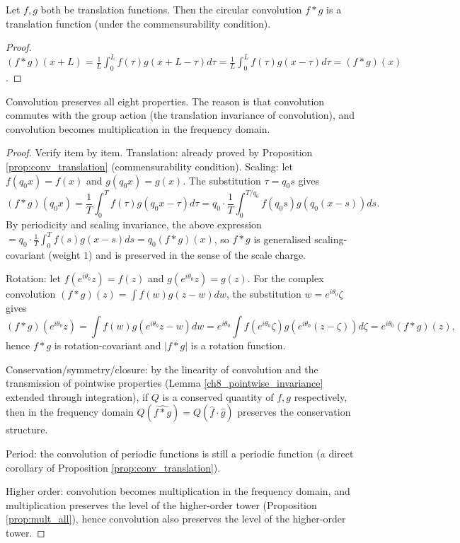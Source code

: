 \begin{proposition}\label{prop:conv_translation}
Let $f, g$ both be translation functions. Then the circular convolution $f * g$ is a translation function (under the commensurability condition).
\end{proposition}

\begin{proof}
$(f * g)(x+L) = \frac{1}{L}\int_0^L f(\tau) g(x+L-\tau) d\tau = \frac{1}{L}\int_0^L f(\tau) g(x-\tau) d\tau = (f * g)(x)$.
\end{proof}

\begin{proposition}\label{prop:conv_all}
Convolution preserves all eight properties. The reason is that convolution commutes with the group action (the translation invariance of convolution), and convolution becomes multiplication in the frequency domain.
\end{proposition}

\begin{proof}
Verify item by item. Translation: already proved by Proposition \ref{prop:conv_translation} (commensurability condition). Scaling: let $f(q_0x)=f(x)$ and $g(q_0x)=g(x)$. The substitution $\tau=q_0s$ gives
\[
(f*g)(q_0x)=\frac{1}{T}\int_0^T f(\tau)g(q_0x-\tau)d\tau
=q_0\cdot\frac{1}{T}\int_0^{T/q_0}f(q_0s)g(q_0(x-s))ds.
\]
By periodicity and scaling invariance, the above expression $=q_0\cdot\frac{1}{T}\int_0^T f(s)g(x-s)ds=q_0(f*g)(x)$, so $f*g$ is generalised scaling-covariant (weight $1$) and is preserved in the sense of the scale charge.

Rotation: let $f(e^{i\theta_0}z)=f(z)$ and $g(e^{i\theta_0}z)=g(z)$. For the complex convolution $(f*g)(z)=\int f(w)g(z-w)dw$, the substitution $w=e^{i\theta_0}\zeta$ gives
\[
(f*g)(e^{i\theta_0}z)=\int f(w)g(e^{i\theta_0}z-w)dw
=e^{i\theta_0}\int f(e^{i\theta_0}\zeta)g(e^{i\theta_0}(z-\zeta))d\zeta
=e^{i\theta_0}(f*g)(z),
\]
hence $f*g$ is rotation-covariant and $|f*g|$ is a rotation function.

Conservation/symmetry/closure: by the linearity of convolution and the transmission of pointwise properties (Lemma \ref{ch8_pointwise_invariance} extended through integration), if $Q$ is a conserved quantity of $f,g$ respectively, then in the frequency domain $Q(\widehat{f*g})=Q(\widehat f\cdot\widehat g)$ preserves the conservation structure.

Period: the convolution of periodic functions is still a periodic function (a direct corollary of Proposition \ref{prop:conv_translation}).

Higher order: convolution becomes multiplication in the frequency domain, and multiplication preserves the level of the higher-order tower (Proposition \ref{prop:mult_all}), hence convolution also preserves the level of the higher-order tower.
\end{proof}

